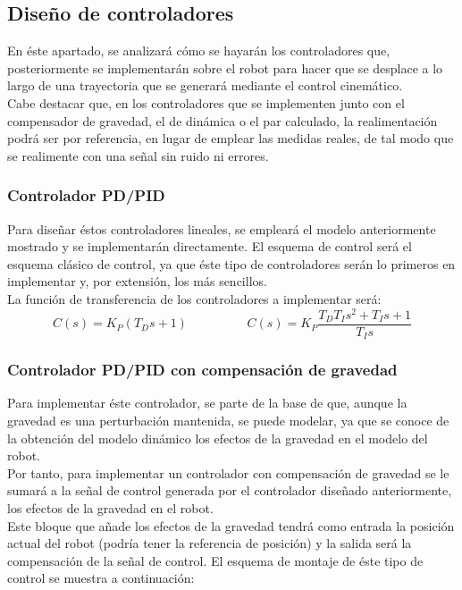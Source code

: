 	\subsection{Diseño de controladores}
	En éste apartado, se analizará cómo se hayarán los controladores que, posteriormente se implementarán sobre el robot para hacer que se desplace a lo largo de una trayectoria que se generará mediante el control cinemático.\\
	Cabe destacar que, en los controladores que se implementen junto con el compensador de gravedad, el de dinámica o el par calculado, la realimentación podrá ser por referencia, en lugar de emplear las medidas reales, de tal modo que se realimente con una señal sin ruido ni errores.\\
	\subsubsection{Controlador PD/PID}
	Para diseñar éstos controladores lineales, se empleará el modelo anteriormente mostrado y se implementarán directamente. El esquema de control será el esquema clásico de control, ya que éste tipo de controladores serán lo primeros en implementar y, por extensión, los más sencillos. \\
	La función de transferencia de los controladores a implementar será:\\
	\begin{equation}
		C(s)=K_{P}(T_{D}s+1) \hspace{2cm} C(s)=K_{P}\frac{T_{D}T_{I}s^{2}+T_{I}s+1}{T_{I}s}
	\end{equation}

	\subsubsection{Controlador PD/PID con compensación de gravedad}
	Para implementar éste controlador, se parte de la base de que, aunque la gravedad es una perturbación mantenida, se puede
modelar, ya que se conoce de la obtención del modelo dinámico los efectos de la gravedad en el modelo del robot.\\
Por tanto, para implementar un controlador con compensación de gravedad se le sumará a la señal de control generada por el
controlador diseñado anteriormente, los efectos de la gravedad en el robot.\\
Este bloque que añade los efectos de la gravedad tendrá como entrada la posición actual del robot (podría tener la referencia de posición) y la salida será la compensación de la señal de control. El esquema de montaje de éste tipo de control se muestra a continuación:

